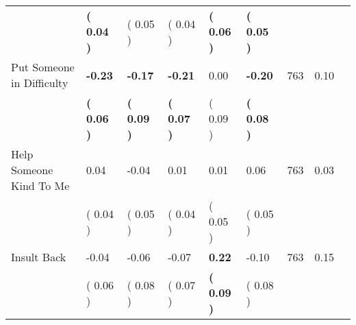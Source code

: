 \begin{tabular}{L{6.2cm} C{1.8cm} C{1.8cm} C{1.8cm} C{1.8cm} C{1.8cm} C{1.8cm} C{0.3cm} C{0.3cm}}
 & \textbf{(     0.04 )} & (     0.05 ) & (     0.04 ) & \textbf{(     0.06 )} & \textbf{(     0.05 )}  & \\
Put Someone in Difficulty & \textbf{    -0.23} & \textbf{    -0.17} & \textbf{    -0.21} &      0.00 & \textbf{    -0.20}  & 763 &       0.10 \\ 
 & \textbf{(     0.06 )} & \textbf{(     0.09 )} & \textbf{(     0.07 )} & (     0.09 ) & \textbf{(     0.08 )}  & \\
Help Someone Kind To Me &      0.04 &     -0.04 &      0.01 &      0.01 &      0.06  & 763 &       0.03 \\ 
 & (     0.04 ) & (     0.05 ) & (     0.04 ) & (     0.05 ) & (     0.05 )  & \\
Insult Back &     -0.04 &     -0.06 &     -0.07 & \textbf{     0.22} &     -0.10  & 763 &       0.15 \\ 
 & (     0.06 ) & (     0.08 ) & (     0.07 ) & \textbf{(     0.09 )} & (     0.08 )  & \\
\bottomrule
\end{tabular}
